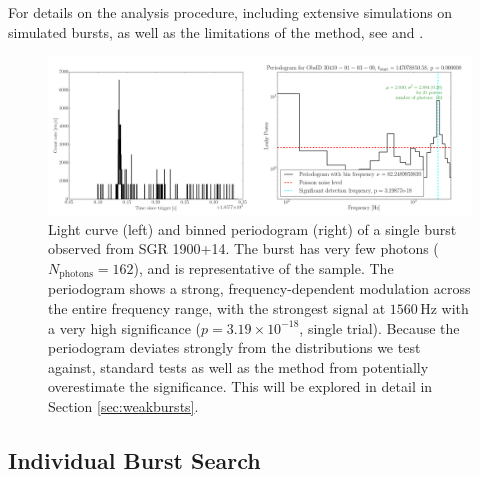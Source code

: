 \documentclass[numberedappendix]{emulateapj}
\newcommand{\hz}{\,\mathrm{Hz}}
\begin{document}
For details on the analysis procedure, including extensive simulations on simulated bursts, as well as the limitations of the method, see \citet{huppenkothen2013} and \citet{vaughan2010}.
\begin{figure}[htbp]
\begin{center}
\includegraphics[width=18cm]{f1.pdf}
\caption{Light curve (left) and binned periodogram (right) of a single burst observed from SGR 1900+14. The burst has very few photons ($N_{\mathrm{photons}} = 162$), and is representative of the sample. The periodogram shows a strong, frequency-dependent modulation across the entire frequency range, with the strongest signal at $1560\hz$ with a very high significance ($p = 3.19 \times 10^{-18}$, single trial). Because the periodogram deviates strongly from the distributions we test against, standard tests as well as the method from \citet{huppenkothen2013} potentially overestimate the significance. This will be explored in detail in Section \ref{sec:weakbursts}.}
\label{fig:psd_individual_example}
\end{center}
\end{figure}

\subsection{Individual Burst Search}
\label{sec:psd_individual}
\end{document}
